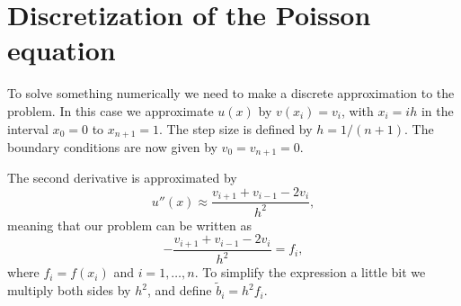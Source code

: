 \documentclass[12pt, a4paper]{article}
\begin{document}
\section{Discretization of the Poisson equation}

To solve something numerically we need to make a discrete approximation to the problem. In this case 
we approximate $u(x)$ by $v(x_i)=v_i$, with $x_i=ih$ in the interval $x_0=0$ to $x_{n+1}=1$. The step 
size is defined by $h=1/(n+1)$. The boundary conditions are now given by $v_0 = v_{n+1} = 0$.   

The second derivative is approximated by 
\begin{equation}
u''(x) \approx \frac{v_{i+1} + v_{i-1} - 2v_i}{h^2}, 
\end{equation}
meaning that our problem can be written as 
\begin{equation}
-\frac{v_{i+1} + v_{i-1} - 2v_i}{h^2} = f_i, 
\label{poisson_disc}
\end{equation}
where $f_i = f(x_i)$ and $i=1,\dots,n$. To simplify the expression a little bit we multiply both sides by 
$h^2$, and define $\tilde{b}_i = h^2 f_i$.  
\end{document}
